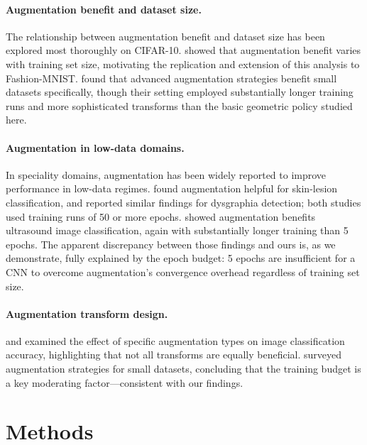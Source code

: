 \documentclass[11pt]{article}
\begin{document}
\paragraph{Augmentation benefit and dataset size.}
The relationship between augmentation benefit and dataset size has been explored
most thoroughly on CIFAR-10.
\citet{karada2020empirical} showed that augmentation benefit varies with training
set size, motivating the replication and extension of this analysis to
Fashion-MNIST.
\citet{kang2024game} found that advanced augmentation strategies benefit small
datasets specifically, though their setting employed substantially longer
training runs and more sophisticated transforms than the basic geometric policy
studied here.

\paragraph{Augmentation in low-data domains.}
In speciality domains, augmentation has been widely reported to improve
performance in low-data regimes.
\citet{pham2018deep} found augmentation helpful for skin-lesion classification,
and \citet{harun2024dysgraphia} reported similar findings for dysgraphia
detection; both studies used training runs of 50 or more epochs.
\citet{snider2023using} showed augmentation benefits ultrasound image
classification, again with substantially longer training than 5 epochs.
The apparent discrepancy between those findings and ours is, as we demonstrate,
fully explained by the epoch budget: 5 epochs are insufficient for a CNN to
overcome augmentation's convergence overhead regardless of training set size.

\paragraph{Augmentation transform design.}
\citet{poojary2021effect} and \citet{zhang2020circular} examined the effect of
specific augmentation types on image classification accuracy, highlighting
that not all transforms are equally beneficial.
\citet{kumar2025enhancing} surveyed augmentation strategies for small datasets,
concluding that the training budget is a key moderating factor---consistent with
our findings.

\section{Methods}
\label{sec:methods}
\end{document}
